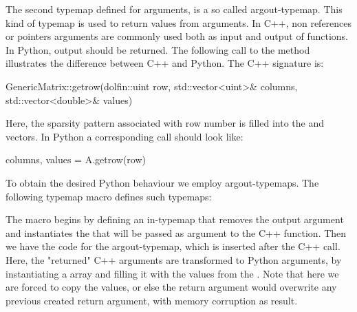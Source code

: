 The second typemap defined for  arguments, is a so called
argout-typemap. This kind of typemap is used to return values from
arguments. In C++, non  references or pointers arguments are
commonly used both as input and output of functions. In Python, output
should be returned. 
The following call to the  method   illustrates
the difference between C++ and Python. The C++ signature is:
\begin{c++}
GenericMatrix::getrow(dolfin::uint row, std::vector<uint>& columns, std::vector<double>& values)
\end{c++}
Here, the sparsity pattern associated with row number  is filled
into the  and  vectors. 
In Python a corresponding call should look like:
\begin{python}
columns, values = A.getrow(row)
\end{python}
To obtain the desired Python behaviour we employ 
argout-typemaps. The following typemap macro defines such typemaps:   
The macro begins by defining an in-typemap that removes the output argument
and instantiates the  that will be passed as argument to
the C++ function. Then we have the code for the argout-typemap, which is inserted after the
C++ call. Here, the "returned" C++ arguments are transformed to Python
arguments, by instantiating a \numpy array  and filling it with
the values from the . Note that here we are forced to copy
the values, or else the return argument would overwrite any previous created return argument, with memory corruption as result.


